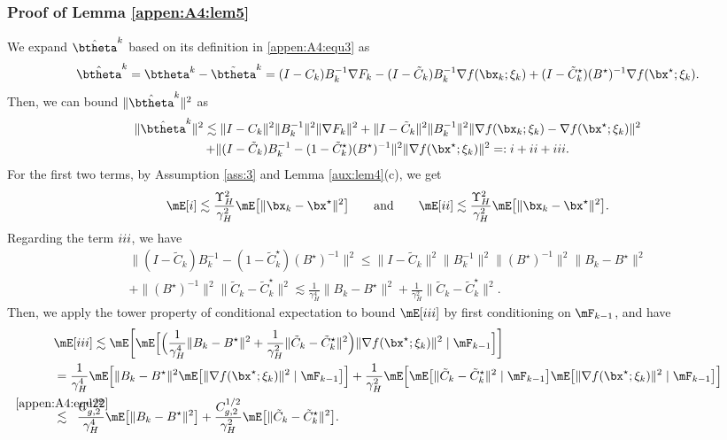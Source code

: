 \subsubsection{Proof of Lemma \ref{appen:A4:lem5}}\label{pf:hattheta}

We expand $\hat{\btheta}^k$ based on its definition in \eqref{appen:A4:equ3} as
\begin{equation*}
\hat{\btheta}^k = \btheta^k - \tilde{\btheta}^k = (I-C_k) B_k^{-1} \nabla F_k -(I-\tilde{C}_k) B_k^{-1} \nabla f(\bx_k; \xi_k) + (I-\tilde{C}_k^\star) (B^{\star})^{-1} \nabla f(\bx^\star; \xi_k).
\end{equation*}
Then, we can bound $\|\hat{\btheta}^k\|^2$ as
\begin{multline*}
\|\hat{\btheta}^k\|^2\lesssim \|I-C_k\|^2 \|B_k^{-1}\|^2 \|\nabla F_k\|^2+\|I-\tilde{C}_k\|^2 \|B_k^{-1}\|^2\|\nabla f(\bx_k; \xi_k)-\nabla f(\bx^\star; \xi_k)\|^2\\
+\|(I-\tilde{C}_k) B_k^{-1}-(1-\tilde{C}_k^\star) (B^{\star})^{-1}\|^2\|\nabla f(\bx^\star; \xi_k)\|^2    =:\uppercase\expandafter{\romannumeral1} + \uppercase\expandafter{\romannumeral2} +  \uppercase\expandafter{\romannumeral3}.
\end{multline*}
For the first two terms, by Assumption \ref{ass:3} and Lemma \ref{aux:lem4}(c), we get
\begin{equation}\label{appen:A4:equ14}
\mE[\uppercase\expandafter{\romannumeral1}] \lesssim \frac{\Upsilon_H^2}{\gamma_H^2}\mE\big[\|\bx_k-\bx^\star\|^2\big]\quad\quad\text{and}\quad\quad\mE[\uppercase\expandafter{\romannumeral2}]  \lesssim \frac{\Upsilon_H^2}{\gamma_H^2}\mE\big[\|\bx_k-\bx^\star\|^2\big].
\end{equation}
Regarding the term $\uppercase\expandafter{\romannumeral3}$, we have
\begin{multline*}
\|(I-\tilde{C}_k) B_k^{-1}-(1-\tilde{C}_k^\star) (B^{\star})^{-1}\|^2\leq\|I-\tilde{C}_k\|^2 \|B_k^{-1}\|^2\|(B^{\star})^{-1}\|^2\|B_k-B^\star\|^2\\
+\|(B^{\star})^{-1}\|^2 \|\tilde{C}_k-\tilde{C}_k^\star\|^2 \lesssim \frac{1}{\gamma_H^4}\|B_k-B^\star\|^2+ \frac{1}{\gamma_H^2}\|\tilde{C}_k-\tilde{C}_k^\star\|^2.
\end{multline*}
Then, we apply the tower property of conditional expectation to bound $\mE[\uppercase\expandafter{\romannumeral3}]$ by first conditioning on $\mF_{k-1}$, and have
\begin{align}\label{appen:A4:equ13}
& \mE[\uppercase\expandafter{\romannumeral3}]
\lesssim \mE\bigg[ \mE\Big[\Big(\frac{1}{\gamma_H^4}\|B_k-B^\star\|^2+ \frac{1}{\gamma_H^2}\|\tilde{C}_k-\tilde{C}_k^\star\|^2\Big)\|\nabla f(\bx^\star;\xi_k)\|^2\mid\mF_{k-1}\Big] \bigg]\nonumber\\
&=\frac{1}{\gamma_H^4}\mE\Big[\|B_k-B^\star\|^2\mE\big[\|\nabla f(\bx^\star;\xi_k)\|^2\mid\mF_{k-1}\big]\Big] + \frac{1}{\gamma_H^2}\mE\Big[\mE\big[\|\tilde{C}_k-\tilde{C}_k^\star\|^2\mid \mF_{k-1}\big] \mE\big[\|\nabla f(\bx^\star;\xi_k)\|^2\mid\mF_{k-1}\big]\Big]\nonumber\\
&\stackrel{\mathclap{\eqref{appen:A4:equ22}}}{\lesssim}\;\;\frac{C_{g,2}^{1/2}}{\gamma_H^4}\mE\big[\|B_k-B^\star\|^2\big]+\frac{C_{g,2}^{1/2}}{\gamma_H^2}\mE\big[\|\tilde{C}_k-\tilde{C}_k^\star\|^2\big].
\end{align}
